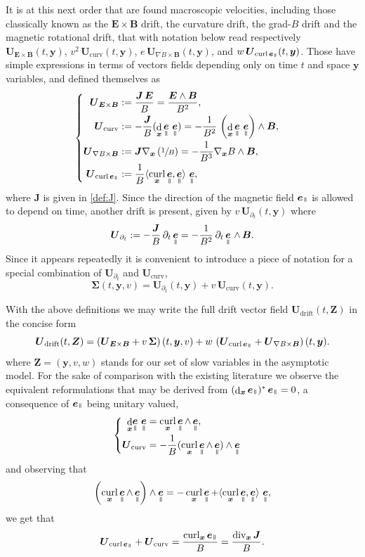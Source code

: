 \documentclass[10pt]{amsart}
\newenvironment{splitcases}
{\begin{cases}\begin{aligned}}
{\end{aligned}\end{cases}}
\let\d\partial
\DeclareMathOperator\dD{d}\let\dd\dD
\DeclareMathOperator{\Div}{div}
\DeclareMathOperator{\Curl}{curl}
\theoremstyle{plain}
\theoremstyle{definition}
\newcommand{\be}{\begin{equation}}
\newcommand{\ee}{\end{equation}}
\newcommand\bB{{\boldsymbol B}}
\newcommand\bE{{\boldsymbol E}}
\newcommand\bJ{{\boldsymbol J}}
\newcommand\bU{{\boldsymbol U}}
\newcommand\bZ{{\boldsymbol Z}}
\newcommand\bfx{{\boldsymbol x}}
\newcommand\bfy{{\boldsymbol y}}
\newcommand\bfZ{{\boldsymbol Z}}
\newcommand\Sig{{\boldsymbol \Sigma}}
\DeclareMathOperator{\beD}{\boldsymbol{e}}
\newcommand\eDpar{\beD_\mypar}
\let\e w
\newcommand{\EcB}{\bU_{\bE\times\bB}}
\newcommand{\gradB}{\bU_{\nabla B\times\bB}}
\newcommand{\curvB}{\bU_{\mathrm{curv}}}
\newcommand{\rotB}{\bU_{\Curl\eDpar}}
\newcommand{\dtB}{\bU_{\d_t}}
\newcommand{\Ud}{\bU_{\mathrm{drift}}}
\newcommand{\mypar}{{\mkern3mu\vphantom{\perp}\vrule depth 0pt\mkern2mu\vrule depth 0pt\mkern3mu}}
\begin{document}
It is at this next order that are found macroscopic velocities, including those classically known as the $\bE\times \bB$ drift, the curvature drift, the grad-$B$ drift and the magnetic rotational drift, that with notation below read respectively $\EcB(t,\bfy)$, $v^2\,
\curvB(t,\bfy)$, $e\,\gradB(t,\bfy)$, and $\e\,\rotB(t,\bfy)$. Those have simple expressions in terms of vectors fields depending only on time $t$ and space $\bfy$ variables, and defined themselves as
\be
\label{drift-0}
\begin{splitcases}
\EcB &:=\frac{\bJ\,\bE}{B}
=\frac{\bE\wedge\bB}{B^2},
\\
 \curvB&:=
-\frac{\bJ}{B}(\dD_{\bfx}\eDpar\,\eDpar)
=-\frac{1}{B^2}\,\left(\dD_{\bfx}\eDpar\,\eDpar\right)\wedge\bB,
\\
\gradB &:=
\bJ\nabla_\bfx\left(\sfrac1B\right)
=-\frac{1}{B^3}
\nabla_\bfx B \wedge \bB,
\\
\rotB&:=\frac{1}{B}\langle\Curl_\bfx \eDpar,\eDpar\rangle\,\eDpar,
\end{splitcases}
\ee
where $\bJ$ is given in \eqref{def:J}. Since the direction of the magnetic field $\eDpar$ is allowed to depend on time, another drift is present, given by $v\, \dtB(t,\bfy)$ where
\be
\dtB:=
-\frac{\bJ}{B}\,\d_t\eDpar
=-\frac{1}{B^2}\,\d_t\eDpar\,\wedge\,\bB.
\label{drift-1}
\ee
Since it appears repeatedly it is convenient to introduce a piece of notation for a special combination of $\dtB$ and $\curvB$,
\be
\Sig(t,\bfy,v) = \dtB(t,\bfy) +v\,\curvB(t,\bfy).
\label{drift-2}
\ee

With the above definitions we may write the full drift vector field $\Ud(t,\bfZ)$ in the concise form
\be
\label{drift-3}
\Ud(t,\bZ) = \left(\EcB+v\,\Sig\right)(t,\bfy,v)+ \e\,\left( \rotB+\gradB\right)(t,\bfy).
\ee
where $\bZ=(\bfy,v,\e)$ stands for our set of slow variables in the
asymptotic model. For the sake of comparison with the existing
literature we observe the equivalent reformulations that may be derived from $(\dD_\bfx\eDpar)^*\eDpar=0$, a consequence of $\eDpar$ being unitary valued,
\[
\begin{splitcases}
\dD_{\bfx}\!\eDpar\,\eDpar&=\Curl_\bfx \eDpar\wedge\eDpar,
\\
\curvB&=-\frac{1}{B}(\Curl_\bfx \eDpar\wedge\eDpar)\wedge\eDpar
\end{splitcases}
\]
and observing that
\[
\left(\Curl_\bfx \eDpar \wedge \eDpar\right)\wedge \eDpar = -\Curl_\bfx\eDpar
+ \langle \Curl_\bfx\eDpar,\eDpar\rangle\,\eDpar,
\]
we get that
\be
\label{formule:utile}
\rotB+\curvB= \frac{\Curl_\bfx \eDpar}{B}=\frac{\Div_\bfx \bJ}{B}.
\ee
\end{document}
